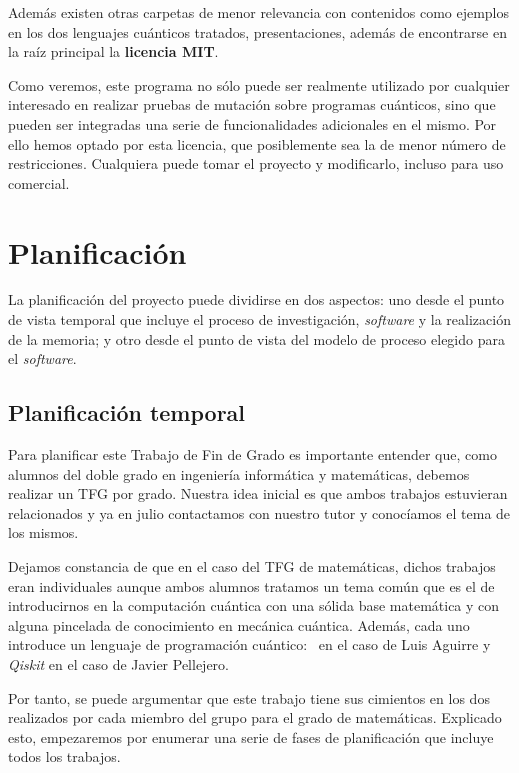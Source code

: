 Además existen otras carpetas de menor relevancia con contenidos como ejemplos en los dos lenguajes cuánticos tratados, presentaciones, además de encontrarse en la raíz principal la \textbf{licencia MIT}.

Como veremos, este programa no sólo puede ser realmente utilizado por cualquier interesado en realizar pruebas de mutación sobre programas cuánticos, sino que pueden ser integradas una serie de funcionalidades adicionales en el mismo. Por ello hemos optado por esta licencia, que posiblemente sea la de menor número de restricciones. Cualquiera puede tomar el proyecto y modificarlo, incluso para uso comercial.

\section{Planificación}

La planificación del proyecto puede dividirse en dos aspectos: uno desde el punto de vista temporal que incluye el proceso de investigación, \textit{software} y la realización de la memoria; y otro desde el punto de vista del modelo de proceso elegido para el \textit{software}.

\subsection{Planificación temporal}

Para planificar este Trabajo de Fin de Grado es importante entender que, como alumnos del doble grado en ingeniería informática y matemáticas, debemos realizar un TFG por grado. Nuestra idea inicial es que ambos trabajos estuvieran relacionados y ya en julio contactamos con nuestro tutor y conocíamos el tema de los mismos.

Dejamos constancia de que en el caso del TFG de matemáticas, dichos trabajos eran individuales aunque ambos alumnos tratamos un tema común que es el de introducirnos en la computación cuántica con una sólida base matemática y con alguna pincelada de conocimiento en mecánica cuántica. Además, cada uno introduce un lenguaje de programación cuántico: \qsh\ en el caso de Luis Aguirre y \textit{Qiskit} en el caso de Javier Pellejero.

Por tanto, se puede argumentar que este trabajo tiene sus cimientos en los dos realizados por cada miembro del grupo para el grado de matemáticas. Explicado esto, empezaremos por enumerar una serie de fases de planificación que incluye todos los trabajos.

